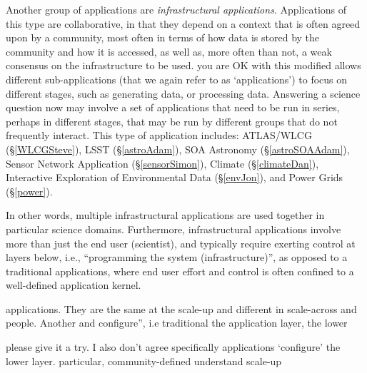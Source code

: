 \documentclass[times]{cpeauth}
\newcommand{\jhanote}[1]{ {\textcolor{blue} { ***Shantenu: #1 }}}
\begin{document}
Another group of applications are {\em infrastructural applications}.
Applications of this type are collaborative, in that they depend on a context
that is often agreed upon by a community, most often in terms of how data is
stored by the community and how it is accessed, as well as, more often than not,
a weak consensus on the infrastructure to be used. %
you are OK with this modified %
allows different sub-applications (that we again refer to as `applications') to
focus on different stages, such as generating data, or processing data.
Answering a science question now may involve a set of applications that need to
be run in series, perhaps in different stages, that may be run by different
groups that do not frequently interact.  This type of application includes:
ATLAS/WLCG (\S\ref{WLCGSteve}), LSST (\S\ref{astroAdam}), SOA Astronomy
(\S\ref{astroSOAAdam}), Sensor Network Application (\S\ref{sensorSimon}),
Climate (\S\ref{climateDan}), Interactive Exploration of Environmental Data
(\S\ref{envJon}), and Power Grids (\S\ref{power}).

In other words, multiple infrastructural applications are used together in
particular science domains.  Furthermore, infrastructural applications involve
more than just the end user (scientist), and typically require exerting control
at layers below, i.e., ``programming the system (infrastructure)'', as opposed
to a traditional applications, where end user effort and control is often
confined to a well-defined application kernel.


applications. They are the same at the scale-up and %
different in scale-across and people. Another %
and configure'', i.e traditional %
the application layer, %
the lower %

please give it a try.  I also don't agree specifically %
applications `configure' the lower layer.  %
particular, community-defined %
understand scale-up %
\end{document}
